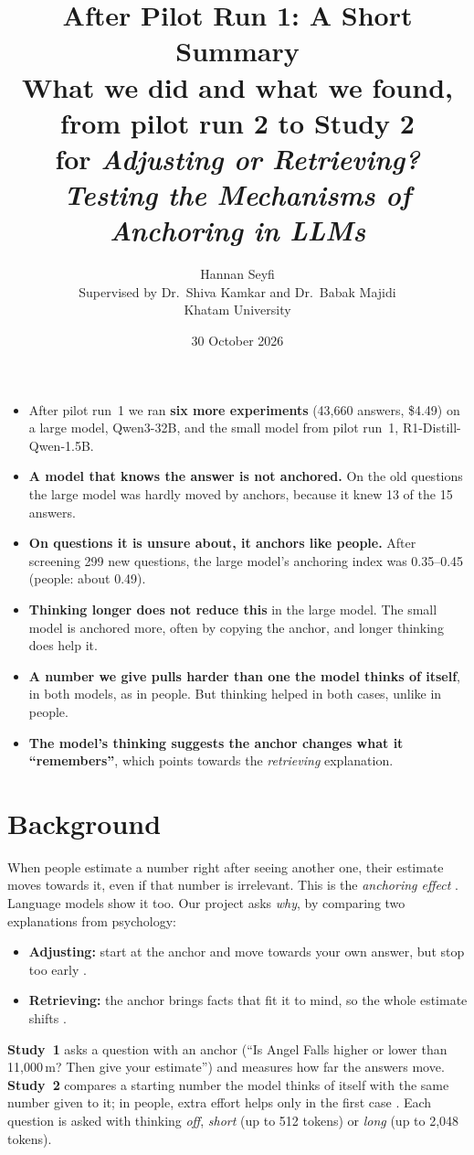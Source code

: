 \documentclass[11pt,a4paper]{article}
\title{\textbf{After Pilot Run 1: A Short Summary}\\[4pt]
\large What we did and what we found, from pilot run 2 to Study 2\\
\large for \emph{Adjusting or Retrieving? Testing the Mechanisms of Anchoring in LLMs}}
\author{Hannan Seyfi\\[8pt]
\normalsize Supervised by Dr.\ Shiva Kamkar and Dr.\ Babak Majidi\\[8pt]
\normalsize Khatam University}
\date{30 October 2026}
\begin{document}
\maketitle
\thispagestyle{plain}

\begin{tcolorbox}[colback=gray!6, colframe=gray!50, title=\textbf{At a glance}, fonttitle=\normalsize]
\begin{itemize}[leftmargin=*]
  \item After pilot run~1 we ran \textbf{six more experiments} (43,660 answers, \$4.49) on a large model, Qwen3-32B, and the small model from pilot run~1, R1-Distill-Qwen-1.5B.
  \item \textbf{A model that knows the answer is not anchored.} On the old questions the large model was hardly moved by anchors, because it knew 13 of the 15 answers.
  \item \textbf{On questions it is unsure about, it anchors like people.} After screening 299 new questions, the large model's anchoring index was 0.35--0.45 (people: about 0.49).
  \item \textbf{Thinking longer does not reduce this} in the large model. The small model is anchored more, often by copying the anchor, and longer thinking does help it.
  \item \textbf{A number we give pulls harder than one the model thinks of itself}, in both models, as in people. But thinking helped in both cases, unlike in people.
  \item \textbf{The model's thinking suggests the anchor changes what it \enquote{remembers}}, which points towards the \emph{retrieving} explanation.
\end{itemize}
\end{tcolorbox}

\section{Background}

When people estimate a number right after seeing another one, their estimate moves towards it, even if that number is irrelevant. This is the \emph{anchoring effect} \citep{tversky1974judgment}. Language models show it too. Our project asks \emph{why}, by comparing two explanations from psychology:
\begin{itemize}[leftmargin=*]
  \item \textbf{Adjusting:} start at the anchor and move towards your own answer, but stop too early \citep{epley2006anchoring}.
  \item \textbf{Retrieving:} the anchor brings facts that fit it to mind, so the whole estimate shifts \citep{mussweiler1999hypothesis}.
\end{itemize}
\textbf{Study~1} asks a question with an anchor (\enquote{Is Angel Falls higher or lower than 11,000\,m? Then give your estimate}) and measures how far the answers move. \textbf{Study~2} compares a starting number the model thinks of itself with the same number given to it; in people, extra effort helps only in the first case \citep{epley2005effortful}. Each question is asked with thinking \emph{off}, \emph{short} (up to 512 tokens) or \emph{long} (up to 2,048 tokens).
\end{document}
